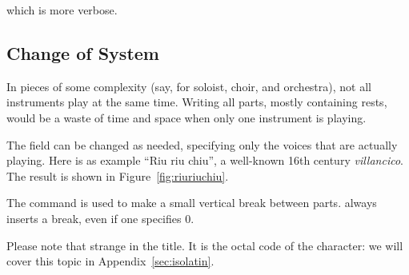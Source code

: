 \documentclass[a4paper,12pt]{book}
\begin{document}
which is more verbose.


\subsection{Change of System}

In pieces of some complexity (say, for soloist, choir, and orchestra),
not all instruments play at the same time. Writing all parts, mostly
containing rests, would be a waste of time and space when only one
instrument is playing.

The  field can be changed as needed, specifying only
the voices that are actually playing. Here is as example ``Riu riu
chiu'', a well-known 16th century \emph{villancico}. The result is
shown in Figure~\ref{fig:riuriuchiu}.

The  command is used to make a small vertical break
between parts.  always inserts a break, even if one
specifies 0. %

Please note that strange  in the title. It is the octal
code of the  character: we will cover this topic in
Appendix~\ref{sec:isolatin}.

\end{document}
